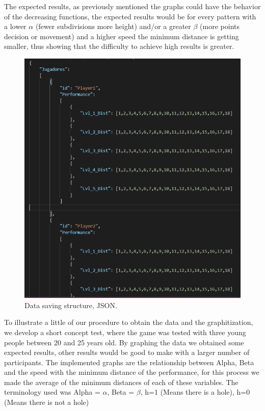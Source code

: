 The expected results, as previously mentioned the graphs could have the behavior of the decreasing functions, the expected results would be for every pattern with a lower $\alpha$ (fewer subdivisions more height) and/or a greater $\beta$ (more points decision or movement) and a higher speed the minimum distance is getting smaller, thus showing that the difficulty to achieve high results is greater.

\begin{figure}[ht]
    \centering
      \includegraphics[width=\linewidth]{Figures/json.png}
      \caption{Data saving structure, JSON.}
    \label{fig:example}
\end{figure}



To illustrate a little of our procedure to obtain the data and the graphitization, we develop a short concept test, where the game was tested with three young people between 20 and 25 years old. By graphing the data we obtained some expected results, other results would be good to make with a larger number of participants. The implemented graphs are the relationship between Alpha, Beta and the speed with the minimum distance of the performance, for this process we made the average of the minimum distances of each of these variables.
The terminology used was Alpha = $\alpha$, Beta = $\beta$, h=1 (Means there is a hole), h=0 (Means there is not a hole)

